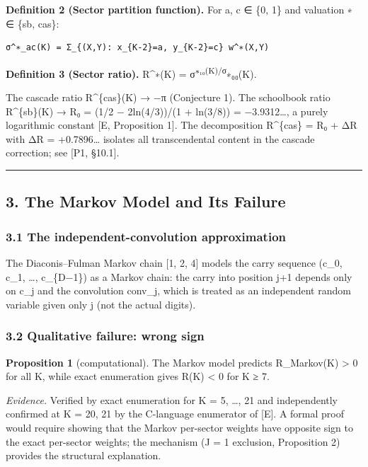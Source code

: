 \documentclass[
  11pt,
]{article}
\begin{document}
\textbf{Definition 2 (Sector partition function).} For a, c ∈ \{0, 1\} and
valuation ∗ ∈ \{sb, cas\}:

\begin{verbatim}
σ^∗_ac(K) = Σ_{(X,Y): x_{K-2}=a, y_{K-2}=c} w^∗(X,Y)
\end{verbatim}

\textbf{Definition 3 (Sector ratio).} R\^{}∗(K) =
σ\textsuperscript{∗₁₀(K)/σ}∗₀₀(K).

The cascade ratio R\^{}\{cas\}(K) → −π (Conjecture 1). The schoolbook ratio
R\^{}\{sb\}(K) → R₀ = (1/2 − 2ln(4/3))/(1 + ln(3/8)) = −3.9312\ldots, a purely
logarithmic constant {[}E, Proposition 1{]}. The decomposition R\^{}\{cas\} = R₀
+ ΔR with ΔR = +0.7896\ldots{} isolates all transcendental content in the
cascade correction; see {[}P1, §10.1{]}.

\begin{center}\rule{0.5\linewidth}{0.5pt}\end{center}

\newpage

\subsection{3. The Markov Model and Its
Failure}\label{the-markov-model-and-its-failure}

\subsubsection{3.1 The independent-convolution
approximation}\label{the-independent-convolution-approximation}

The Diaconis--Fulman Markov chain {[}1, 2, 4{]} models the carry sequence (c\_0,
c\_1, \ldots, c\_\{D−1\}) as a Markov chain: the carry into position j+1 depends
only on c\_j and the convolution conv\_j, which is treated as an independent
random variable given only j (not the actual digits).

\subsubsection{3.2 Qualitative failure: wrong
sign}\label{qualitative-failure-wrong-sign}

\textbf{Proposition 1} (computational). The Markov model predicts R\_Markov(K)
\textgreater{} 0 for all K, while exact enumeration gives R(K) \textless{} 0 for
K ≥ 7.

\emph{Evidence.} Verified by exact enumeration for K = 5, \ldots, 21 and
independently confirmed at K = 20, 21 by the C-language enumerator of {[}E{]}. A
formal proof would require showing that the Markov per-sector weights have
opposite sign to the exact per-sector weights; the mechanism (J = 1 exclusion,
Proposition 2) provides the structural explanation.
\end{document}
